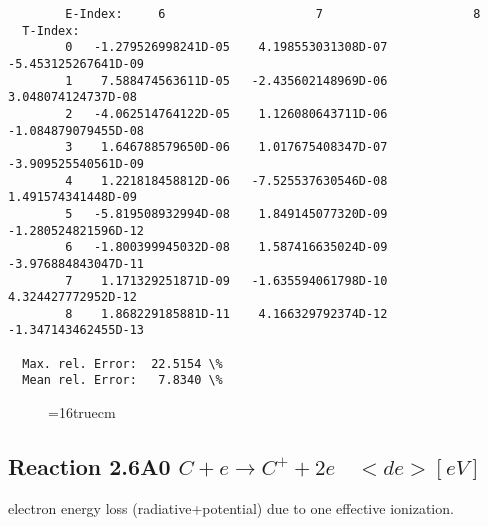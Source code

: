 \documentclass[12pt,dvipdfmx]{article}
\begin{document}
\begin{small}
\begin{verbatim}
        E-Index:     6                     7                     8
  T-Index:
        0   -1.279526998241D-05    4.198553031308D-07   -5.453125267641D-09
        1    7.588474563611D-05   -2.435602148969D-06    3.048074124737D-08
        2   -4.062514764122D-05    1.126080643711D-06   -1.084879079455D-08
        3    1.646788579650D-06    1.017675408347D-07   -3.909525540561D-09
        4    1.221818458812D-06   -7.525537630546D-08    1.491574341448D-09
        5   -5.819508932994D-08    1.849145077320D-09   -1.280524821596D-12
        6   -1.800399945032D-08    1.587416635024D-09   -3.976884843047D-11
        7    1.171329251871D-09   -1.635594061798D-10    4.324427772952D-12
        8    1.868229185881D-11    4.166329792374D-12   -1.347143462455D-13

  Max. rel. Error:  22.5154 \%
  Mean rel. Error:   7.8340 \%

\end{verbatim}\end{small}
\begin{figure} \label{2.3.13aec}
\epsfxsize=16truecm
\end{figure}
\newpage


\subsection{
  Reaction 2.6A0 $C  + e \rightarrow C^+   + 2e $ \ $<de> [eV] $
}

  electron energy loss (radiative+potential) due to one effective ionization.
\end{document}
